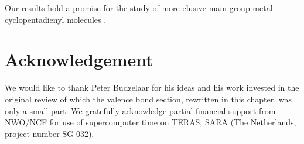 Our results hold a promise for the study of more elusive main group metal cyclopentadienyl molecules \cite{budzelaar}.

\section*{Acknowledgement}
We would like to thank Peter Budzelaar for his ideas and his work invested in the original review \cite{budzelaar} of which the valence bond section, rewritten in this chapter, was only a small part. We gratefully acknowledge partial financial support from NWO/NCF for use of supercomputer time on TERAS, SARA (The Netherlands, project number SG-032).  



